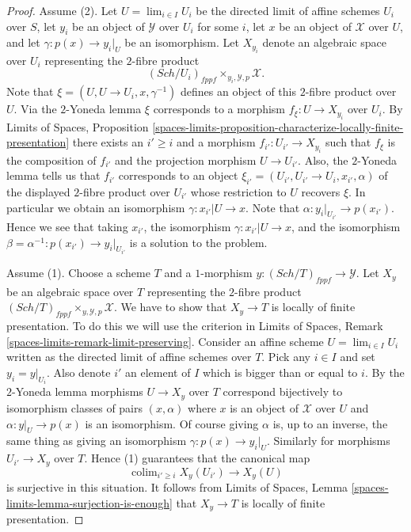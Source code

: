 \documentclass{stacks-project}
\theoremstyle{plain}
\theoremstyle{definition}
\theoremstyle{remark}
\numberwithin{equation}{subsection}
\def\lim{\mathop{\mathrm{lim}}\nolimits}
\def\colim{\mathop{\mathrm{colim}}\nolimits}
\def\Sch{\mathit{Sch}}
\begin{document}
\begin{proof}
Assume (2). Let $U = \lim_{i \in I} U_i$ be the directed limit
of affine schemes $U_i$ over $S$, let $y_i$ be an object of $\mathcal{Y}$
over $U_i$ for some $i$, let $x$ be an object of $\mathcal{X}$ over $U$,
and let $\gamma : p(x) \to y_i|_U$ be an isomorphism. Let
$X_{y_i}$ denote an algebraic space over $U_i$ representing the $2$-fibre
product
$$
(\Sch/U_i)_{fppf} \times_{y_i, \mathcal{Y}, p} \mathcal{X}.
$$
Note that $\xi = (U, U \to U_i, x, \gamma^{-1})$ defines an object of
this $2$-fibre product over $U$. Via the $2$-Yoneda lemma $\xi$ corresponds
to a morphism $f_\xi : U \to X_{y_i}$ over $U_i$. By
Limits of Spaces, Proposition
\ref{spaces-limits-proposition-characterize-locally-finite-presentation}
there exists an $i' \geq i$ and a morphism $f_{i'} : U_{i'} \to X_{y_i}$
such that $f_\xi$ is the composition of $f_{i'}$ and the projection
morphism $U \to U_{i'}$. Also, the $2$-Yoneda lemma tells us that
$f_{i'}$ corresponds to an object
$\xi_{i'} = (U_{i'}, U_{i'} \to U_i, x_{i'}, \alpha)$ of
the displayed $2$-fibre product over $U_{i'}$ whose restriction to
$U$ recovers $\xi$. In particular we obtain an isomorphism
$\gamma : x_{i'}|U \to x$. Note that $\alpha : y_i|_{U_{i'}} \to p(x_{i'})$.
Hence we see that taking $x_{i'}$, the isomorphism
$\gamma : x_{i'}|U \to x$, and the isomorphism
$\beta = \alpha^{-1} : p(x_{i'}) \to y_i|_{U_{i'}}$
is a solution to the problem.

\medskip\noindent
Assume (1). Choose a scheme $T$ and a $1$-morphism
$y : (\Sch/T)_{fppf} \to \mathcal{Y}$. Let
$X_y$ be an algebraic space over $T$ representing the $2$-fibre product
$(\Sch/T)_{fppf} \times_{y, \mathcal{Y}, p} \mathcal{X}$.
We have to show that $X_y \to T$ is locally of finite presentation.
To do this we will use the criterion in
Limits of Spaces, Remark \ref{spaces-limits-remark-limit-preserving}.
Consider an affine scheme $U = \lim_{i \in I} U_i$ written as the
directed limit of affine schemes over $T$.
Pick any $i \in I$ and set $y_i = y|_{U_i}$. Also denote $i'$ an element
of $I$ which is bigger than or equal to $i$. By the $2$-Yoneda lemma
morphisms $U \to X_y$ over $T$ correspond bijectively
to isomorphism classes of pairs $(x, \alpha)$ where $x$ is an object
of $\mathcal{X}$ over $U$ and $\alpha : y|_U \to p(x)$ is an isomorphism.
Of course giving $\alpha$ is, up to an inverse, the same thing as giving
an isomorphism $\gamma : p(x) \to y_i|_U$.
Similarly for morphisms $U_{i'} \to X_y$ over $T$. Hence (1) guarantees
that the canonical map
$$
\colim_{i' \geq i} X_y(U_{i'}) \longrightarrow X_y(U)
$$
is surjective in this situation. It follows from
Limits of Spaces, Lemma \ref{spaces-limits-lemma-surjection-is-enough}
that $X_y \to T$ is locally of finite presentation.
\end{proof}
\end{document}
